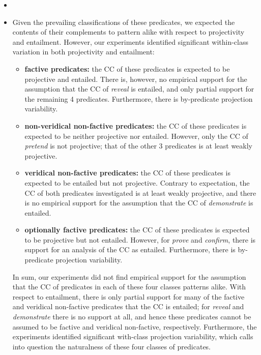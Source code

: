 \documentclass[11pt,fleqn]{article}
\newcommand{\6}{\mbox{$[\hspace*{-.6mm}[$}}
\newcommand{\9}{\mbox{$]\hspace*{-.6mm}]$}}
\begin{document}
{\begin{itemize}
\item 

\item Given the prevailing classifications of these predicates, we expected the contents of their complements to pattern alike with respect to projectivity and entailment. However, our experiments identified significant within-class variation in both projectivity and entailment:

\begin{itemize}[topsep=-1pt,itemsep=1pt]

\item {\bf factive predicates:} the CC of these predicates is expected to be projective and entailed. There is, however, no empirical support for the assumption that the CC of {\em reveal} is entailed, and only partial support for the remaining 4 predicates. Furthermore, there is by-predicate projection variability.

\item {\bf non-veridical non-factive predicates:} the CC of these predicates is expected to be neither projective nor entailed. However, only the CC of {\em pretend} is not projective; that of the other 3 predicates is at least weakly projective.

\item {\bf veridical non-factive predicates:} the CC of these predicates is expected to be entailed but not projective. Contrary to expectation, the CC of both predicates investigated is at least weakly projective, and there is no empirical support for the assumption that the CC of {\em demonstrate} is entailed. 

\item {\bf optionally factive predicates:} the CC of these predicates is expected to be projective but not entailed. However, for {\em prove} and {\em confirm}, there is support for an analysis of the CC as entailed. Furthermore, there is by-predicate projection variability.

\end{itemize}

In sum, our experiments did not find empirical support for the assumption that the CC of predicates in each of these four classes patterns alike. With respect to entailment, there is only partial support for many of the factive and veridical non-factive predicates that the CC is entailed; for {\em reveal} and {\em demonstrate} there is no support at all, and hence these predicates cannot be assumed to be factive and veridical non-factive, respectively. Furthermore, the experiments identified significant with-class projection variability, which calls into question the naturalness of these four classes of predicates. 


\end{itemize}}
\end{document}
